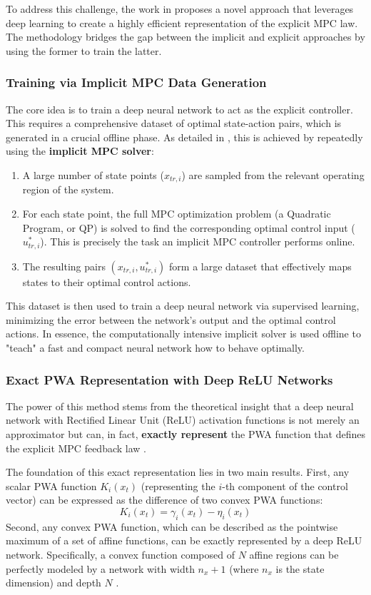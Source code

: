 To address this challenge, the work in \cite{karg2018efficient} proposes a novel approach that leverages deep learning to create a highly efficient representation of the explicit MPC law. The methodology bridges the gap between the implicit and explicit approaches by using the former to train the latter.

\subsubsection{Training via Implicit MPC Data Generation}
The core idea is to train a deep neural network to act as the explicit controller. This requires a comprehensive dataset of optimal state-action pairs, which is generated in a crucial offline phase. As detailed in \cite{karg2018efficient}, this is achieved by repeatedly using the \textbf{implicit MPC solver}:
\begin{enumerate}
    \item A large number of state points ($x_{tr,i}$) are sampled from the relevant operating region of the system.
    \item For each state point, the full MPC optimization problem (a Quadratic Program, or QP) is solved to find the corresponding optimal control input ($u^*_{tr,i}$). This is precisely the task an implicit MPC controller performs online.
    \item The resulting pairs $(x_{tr,i}, u^*_{tr,i})$ form a large dataset that effectively maps states to their optimal control actions.
\end{enumerate}
This dataset is then used to train a deep neural network via supervised learning, minimizing the error between the network's output and the optimal control actions. In essence, the computationally intensive implicit solver is used offline to "teach" a fast and compact neural network how to behave optimally.

\subsubsection{Exact PWA Representation with Deep ReLU Networks}
The power of this method stems from the theoretical insight that a deep neural network with Rectified Linear Unit (ReLU) activation functions is not merely an approximator but can, in fact, \textbf{exactly represent} the PWA function that defines the explicit MPC feedback law \cite{karg2018efficient}.

The foundation of this exact representation lies in two main results. First, any scalar PWA function $K_i(x_t)$ (representing the $i$-th component of the control vector) can be expressed as the difference of two convex PWA functions:
\begin{equation}
    K_i(x_t) = \gamma_i(x_t) - \eta_i(x_t)
\end{equation}
Second, any convex PWA function, which can be described as the pointwise maximum of a set of affine functions, can be exactly represented by a deep ReLU network. Specifically, a convex function composed of $N$ affine regions can be perfectly modeled by a network with width $n_x + 1$ (where $n_x$ is the state dimension) and depth $N$ \cite{karg2018efficient}.

